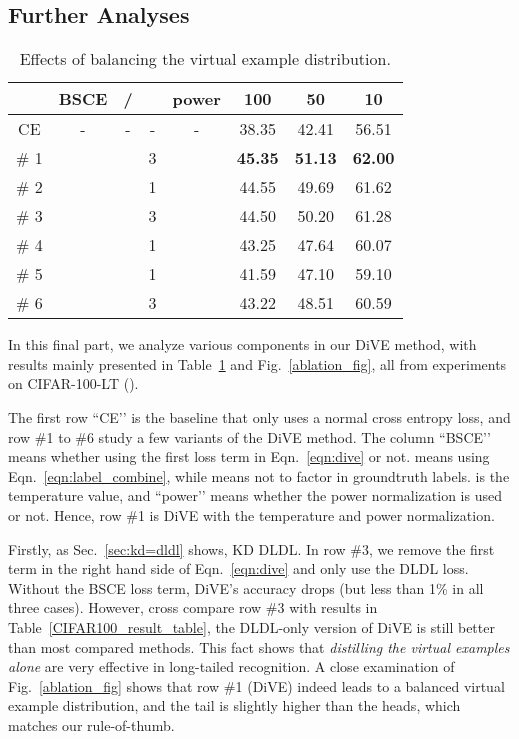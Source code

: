 \documentclass[10pt,twocolumn,letterpaper]{article}
\newcommand{\cmark}{\ding{51}}
\newcommand{\xmark}{\ding{55}}
\begin{document}
\subsection{Further Analyses}\label{sec:analysis}

\begin{table}
   \caption{Effects of balancing the virtual example distribution.} 
   \centering
   \small
   \setlength{\tabcolsep}{1.6mm}
      \begin{tabular}{ccccc|ccc}
      \hline
       & BSCE & / &  & power & 100 & 50 & 10  \\
      \hline \hline
       CE & -  & - & - & - & 38.35 & 42.41 & 56.51 \\
      \# 1 & \cmark &  & 3 & \cmark & \textbf{45.35} & \textbf{51.13} & \textbf{62.00} \\
      \# 2 & \xmark &  & 1 & \cmark & 44.55 & 49.69 & 61.62 \\
      \# 3 & \xmark &  & 3 & \cmark & 44.50 & 50.20 & 61.28 \\
      \# 4 & \xmark &  & 1 & \xmark & 43.25 & 47.64 & 60.07 \\
      \# 5 & \xmark &  & 1 & \xmark & 41.59 & 47.10 & 59.10 \\
      \# 6 & \xmark &  & 3 & \cmark & 43.22 & 48.51 & 60.59 \\
      \hline
      \end{tabular}
   \label{ablation_table}
\end{table}

In this final part, we analyze various components in our DiVE method, with results mainly presented in Table~\ref{ablation_table} and Fig.~\ref{ablation_fig}, all from experiments on CIFAR-100-LT ().

The first row ``CE’’ is the baseline that only uses a normal cross entropy loss, and row \#1 to \#6 study a few variants of the DiVE method. The column ``BSCE’’ means whether using the first loss term in Eqn.~\eqref{eqn:dive} or not.   means using Eqn.~\eqref{eqn:label_combine}, while  means not to factor in groundtruth labels.  is the temperature value, and ``power’’ means whether the power normalization is used or not. Hence, row \#1 is DiVE with the temperature  and power normalization.

Firstly, as Sec.~\ref{sec:kd=dldl} shows, KD  DLDL. In row \#3, we remove the first term in the right hand side of Eqn.~\eqref{eqn:dive} and only use the DLDL loss. Without the BSCE loss term, DiVE’s accuracy drops (but less than 1\% in all three cases). However, cross compare row \#3 with results in Table~\ref{CIFAR100_result_table}, the DLDL-only version of DiVE is still better than most compared methods. This fact shows that \emph{distilling the virtual examples alone} are very effective in long-tailed recognition. A close examination of Fig.~\ref{ablation_fig} shows that row \#1 (DiVE) indeed leads to a balanced virtual example distribution, and the tail is slightly higher than the heads, which matches our rule-of-thumb.
\end{document}
